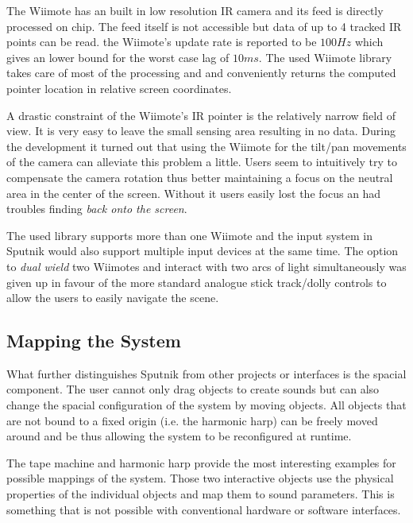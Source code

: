 \documentclass[10pt,a4paper]{scrartcl}
\begin{document}
The Wiimote has an built in low resolution IR camera and its feed is directly processed on chip. The feed itself is not accessible but data of up to 4 tracked IR points can be read. the Wiimote's update rate is reported to be $100Hz$ which gives an lower bound for the worst case lag of $10ms$. The used Wiimote library takes care of most of the processing and and conveniently returns the computed pointer location in relative screen coordinates.

A drastic constraint of the Wiimote's IR pointer is the relatively narrow field of view. It is very easy to leave the small sensing area resulting in no data. During the development it turned out that using the Wiimote for the tilt/pan movements of the camera can alleviate this problem a little. Users seem to intuitively try to compensate the camera rotation thus better maintaining a focus on the neutral area in the center of the screen. Without it users easily lost the focus an had troubles finding \emph{back onto the screen}.

The used library supports more than one Wiimote and the input system in Sputnik would also support multiple input devices at the same time. The option to \emph{dual wield} two Wiimotes and interact with two arcs of light simultaneously was given up in favour of the more standard analogue stick track/dolly controls to allow the users to easily navigate the scene. 









\subsection{Mapping the System}
What further distinguishes Sputnik from other projects or interfaces is the spacial component. The user cannot only drag objects to create sounds but can also change the spacial configuration of the system by moving objects. All objects that are not bound to a fixed origin (i.e. the harmonic harp) can be freely moved around and be thus allowing the system to be reconfigured at runtime. 

The tape machine and harmonic harp provide the most interesting examples for possible mappings of the system. Those two interactive objects use the physical properties of the individual objects and map them to sound parameters. This is something that is not possible with conventional hardware or software interfaces.
\end{document}
